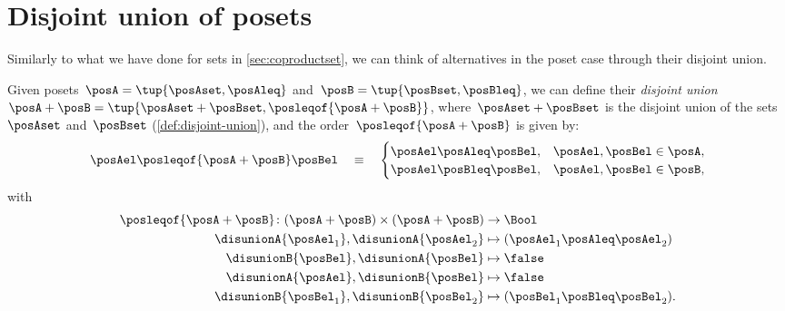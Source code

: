
\section{Disjoint union of posets}
Similarly to what we have done for sets in \cref{sec:coproductset}, we can think of alternatives in the poset case through their disjoint union.

\begin{definition}
    Given posets~$\posA=\tup{\posAset, \posAleq}$ and~$\posB=\tup{\posBset, \posBleq}$, we can define their \emph{disjoint union}~$\posA+\posB=\tup{\posAset + \posBset, \posleqof{\posA + \posB}}$, where~$\posAset + \posBset$ is the disjoint union of the sets~$\posAset$ and~$\posBset$ (\cref{def:disjoint-union}), and the order~$\posleqof{\posA + \posB}$ is given by:
    \begin{equation}
        \posAel \posleqof{\posA + \posB} \posBel \quad\equiv\quad
        \begin{cases}
            \posAel \posAleq \posBel, & \posAel,\posBel \in \posA, \\
            \posAel \posBleq \posBel, & \posAel,\posBel \in \posB,
        \end{cases}
    \end{equation}
    with
    \begin{equation}
        \begin{aligned}
            \posleqof{\posA+\posB}\colon (\posA+\posB)\times (\posA+\posB) & \to \Bool                              \\
            \disunionA{\posAel_1},\disunionA{\posAel_2}                    & \mapsto (\posAel_1\posAleq \posAel_2)  \\
            \disunionB{\posBel},\disunionA{\posBel}                        & \mapsto \false                         \\
            \disunionA{\posAel},\disunionB{\posBel}                        & \mapsto \false                         \\
            \disunionB{\posBel_1},\disunionB{\posBel_2}                    & \mapsto (\posBel_1\posBleq \posBel_2).
        \end{aligned}
    \end{equation}
\end{definition}

